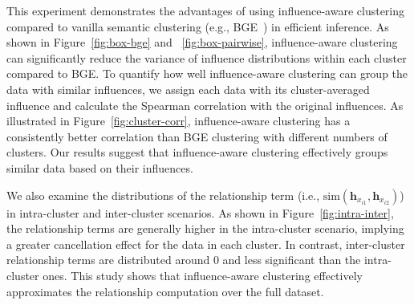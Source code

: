 This experiment demonstrates the advantages of using influence-aware clustering compared to vanilla semantic clustering (e.g., BGE~\cite{xiao2024bge}) in efficient inference. 
As shown in Figure~\ref{fig:box-bge} and ~\ref{fig:box-pairwise}, influence-aware clustering can significantly reduce the variance of influence distributions within each cluster compared to BGE. 
To quantify how well influence-aware clustering can group the data with similar influences, we assign each data with its cluster-averaged influence and calculate the Spearman correlation with the original influences. As illustrated in Figure~\ref{fig:cluster-corr}, influence-aware clustering has a consistently better correlation than BGE clustering with different numbers of clusters. Our results suggest that influence-aware clustering effectively groups similar data based on their influences.

We also examine the distributions of the relationship term (i.e., $\text{sim}(\textbf{h}_{x_{i1}},\textbf{h}_{x_{i2}})$) in intra-cluster and inter-cluster scenarios. As shown in Figure~\ref{fig:intra-inter}, the relationship terms are generally higher in the intra-cluster scenario, implying a greater cancellation effect for the data in each cluster. In contrast, inter-cluster relationship terms are distributed around 0 and less significant than the intra-cluster ones. 
This study shows that influence-aware clustering effectively approximates the relationship computation over the full dataset.


